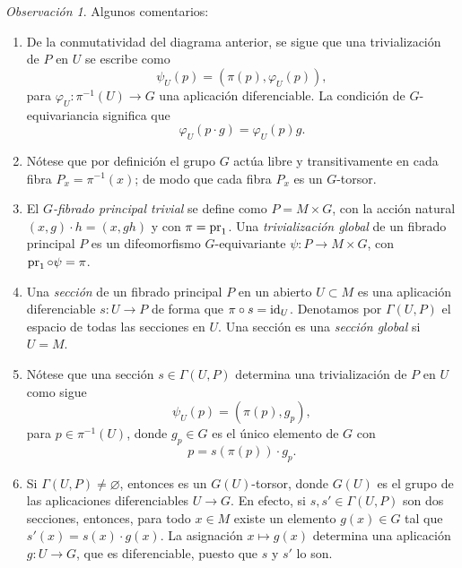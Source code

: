 \documentclass[11pt,a4paper]{amsbook}
\theoremstyle{remark} \newtheorem{rmk}[subsection]{Observación}
\theoremstyle{definition} \newtheorem{defn}[subsection]{Definición}
\theoremstyle{definition} \newtheorem{ex}[subsection]{Ejemplo}
\theoremstyle{definition} \newtheorem{ej}[subsection]{Ejercicio}
\begin{document}
\begin{rmk} Algunos comentarios:
  \begin{enumerate}
    \item De la conmutatividad del diagrama anterior, se sigue que una trivialización de $P$ en $U$ se escribe como
\begin{equation*}
\psi_U(p) = (\pi(p), \varphi_U(p)),
\end{equation*}
          para $\varphi_U:\pi^{-1}(U)\rightarrow G$ una aplicación diferenciable.
          La condición de $G$-equivariancia significa que
          \begin{equation*}
\varphi_U (p\cdot g) = \varphi_U(p) g.
          \end{equation*}
    \item Nótese que por definición el grupo $G$ actúa libre y transitivamente en cada fibra $P_x = \pi^{-1}(x)$; de modo que cada fibra $P_x$ es un $G$-torsor.
    \item El \emph{$G$-fibrado principal trivial} se define como $P=M\times G$, con la acción natural $(x,g)\cdot h=(x,gh)$ y con $\pi=\operatorname{pr}_{1}$. Una \emph{trivialización global} de un fibrado principal $P$ es un difeomorfismo $G$-equivariante $\psi:P\rightarrow M\times G$, con $\operatorname{pr}_1 \circ \psi = \pi$.
    \item Una \emph{sección} de un fibrado principal $P$ en un abierto $U\subset M$ es una aplicación diferenciable $s:U\rightarrow P$ de forma que $\pi\circ s = \mathrm{id}_U$. Denotamos por $\Gamma(U,P)$ el espacio de todas las secciones en $U$. Una sección es una \emph{sección global} si $U=M$.
    \item Nótese que una sección $s\in \Gamma(U,P)$ determina una trivialización de $P$ en $U$ como sigue
          \begin{equation*}
\psi_U(p) = (\pi(p),g_p),
          \end{equation*}
para $p\in \pi^{-1}(U)$, donde $g_p\in G$ es el único elemento de $G$ con
          \begin{equation*}
p = s(\pi(p)) \cdot g_p.
          \end{equation*}
\item Si $\Gamma(U,P)\neq \varnothing$, entonces es un $G(U)$-torsor, donde $G(U)$ es el grupo de las aplicaciones diferenciables $U\rightarrow G$. En efecto, si $s, s'\in \Gamma(U,P)$ son dos secciones, entonces, para todo $x\in M$ existe un elemento $g(x)\in G$ tal que $s'(x)=s(x)\cdot g(x)$. La asignación $x\mapsto g(x)$ determina una aplicación $g:U\rightarrow G$, que es diferenciable, puesto que $s$ y $s'$ lo son.
  \end{enumerate}
\end{rmk}
\end{document}
